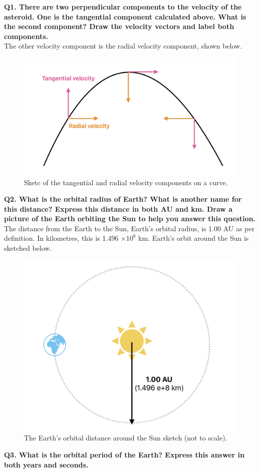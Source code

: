 \documentclass[12pt]{article}
\begin{document}
\textbf{Q1. There are two perpendicular components to the velocity of the asteroid. One is the tangential component calculated above. What is the second component? Draw the velocity vectors and label both components.}\\

The other velocity component is the radial velocity component, shown below.

\begin{figure}[H]
    \centering
    \includegraphics[width=.5\textwidth]{vel comp.png}
    \caption*{Sketc of the tangential and radial velocity components on a curve.}
\end{figure}

\textbf{Q2. What is the orbital radius of Earth? What is another name for this distance? Express this distance in both AU and km. Draw a picture of the Earth orbiting the Sun to help you answer this question.}\\

The distance from the Earth to the Sun, Earth's orbital radius, is 1.00 AU as per definition. In kilometres, this is 1.496 $\times 10^8$ km. Earth's orbit around the Sun is sketched below.

\begin{figure}[H]
    \centering
    \includegraphics[width=.5\textwidth]{sunearth orbit.png}
    \caption*{The Earth's orbital distance around the Sun sketch (not to scale).}
\end{figure}

\textbf{Q3. What is the orbital period of the Earth? Express this answer in both years and seconds.}\\
\end{document}
